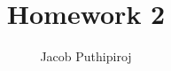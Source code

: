 \documentclass{article}
\begin{document}
\title{Homework 2}
\author{Jacob Puthipiroj}
\maketitle
\end{document}
